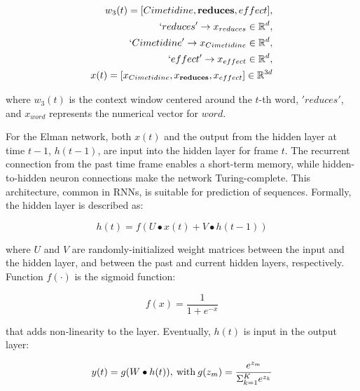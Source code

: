 \documentclass[11pt,letterpaper]{article}
\begin{document}
\vspace{-0.7 cm}

\begin{equation}
\begin{split}
w_{3}(t) = [Cimetidine, \textbf{reduces}, effect], \\
`reduces' \rightarrow x_{reduces} \in \mathbb{R}^{d}, \\
`Cimetidine' \rightarrow x_{Cimetidine} \in \mathbb{R}^{d}, \\
`effect' \rightarrow x_{effect} \in \mathbb{R}^{d}, \\
x(t) = [x_{Cimetidine}, x_{\textbf{reduces}}, x_{effect}] \in \mathbb{R}^{3d}
\end{split}
\end{equation}

\noindent where $w_{3}(t)$ is the context window centered around the $t$-th word, $'reduces'$, and $x_{word}$ represents the numerical vector for $word$.

For the Elman network, both $x(t)$ and the output from the hidden layer at time $t-1$, $h(t -1)$, are input into the hidden layer for frame $t$. The recurrent connection from the past time frame enables a short-term memory, while hidden-to-hidden neuron connections make the network Turing-complete. This architecture, common in RNNs, is suitable for prediction of sequences. Formally, the hidden layer is described as:

\vspace{-0.4 cm}
\begin{equation}
 h(t) = f(U \bullet x(t) + V \bullet h(t-1) )
\end{equation}

\noindent where $U$ and $V$ are randomly-initialized weight matrices between the input and the hidden layer, and between the past and current hidden layers, respectively. Function $f(\cdot)$ is the sigmoid function:

\begin{equation}
f(x)=\frac{1}{1+e^{-x}}
\end{equation}

\noindent that adds non-linearity to the layer. Eventually, $h(t)$ is input in the output layer:

\vspace{-0.6 cm}

\begin{equation}
\label{eq4}
y(t) = g(W \bullet h(t)), \hspace{0.03in} \text{with} \hspace{0.03in}  g(z_{m}) = \frac{e^{z_{m}}} {\Sigma _{k=1}^Ke^{z_{k}} }
\end{equation}
\end{document}

